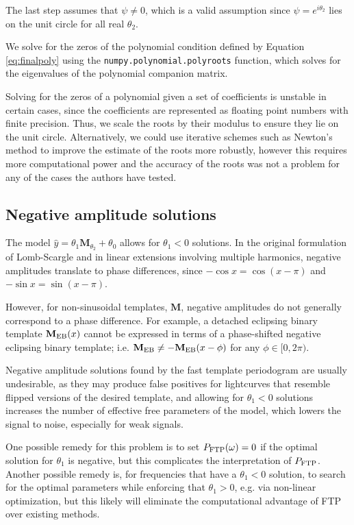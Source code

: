 \documentclass[apj]{emulateapj}
\newcommand{\Mshft}{\mathbf{M}_{\theta_2}}
\newcommand{\eith}{\psi}
\begin{document}
The last step assumes that $\eith\ne 0$, which is a valid assumption since $\eith=e^{i\theta_2}$ lies on the
unit circle for all real $\theta_2$.

We solve for the zeros of the polynomial condition defined by Equation \ref{eq:finalpoly}
using the \texttt{numpy.polynomial.polyroots} function, which solves for the eigenvalues
of the polynomial companion matrix.

Solving for the zeros of a polynomial given a set of coefficients is unstable in certain cases, since the
coefficients are represented as floating point numbers with finite precision. Thus, we scale the roots
by their modulus to ensure they lie on the unit circle. Alternatively, we could use iterative schemes
such as Newton's method to improve the estimate of the roots more robustly, however this requires more computational power and
the accuracy of the roots was not a problem for any of the cases the authors have tested.


\subsection{Negative amplitude solutions}
The model $\hat{y}= \theta_1\Mshft + \theta_0$ allows for $\theta_1 < 0$ solutions.
In the original formulation of Lomb-Scargle and in linear
extensions involving multiple harmonics, negative amplitudes translate to
phase differences, since $-\cos{x} = \cos(x - \pi)$ and $-\sin{x} = \sin(x - \pi)$.

However, for non-sinusoidal templates, $\mathbf{M}$, negative amplitudes
do not generally correspond to a phase difference. For example, a
detached eclipsing binary template $\mathbf{M}_{\rm EB}(x)$ cannot be
expressed in terms of a phase-shifted negative eclipsing binary template; i.e.
$\mathbf{M}_{\rm EB} \neq - \mathbf{M}_{\rm EB}(x - \phi)$ for any $\phi\in[0, 2\pi)$.

Negative amplitude solutions found by the fast template periodogram are usually
undesirable, as they may produce false positives for lightcurves that resemble
flipped versions of the desired template, and allowing for $\theta_1 < 0$ solutions
increases the number of effective free parameters of the model, which lowers
the signal to noise, especially for weak signals.

One possible remedy for this problem is to set $P_{\rm FTP}(\omega) = 0$ if the optimal
solution for $\theta_1$ is negative, but this complicates the interpretation of $P_{\rm FTP}$.
Another possible remedy is, for frequencies that have a $\theta_1 < 0$ solution,
to search for the optimal parameters while enforcing that $\theta_1 > 0$,
e.g. via non-linear optimization, but this likely will eliminate the computational
advantage of FTP over existing methods.
\end{document}
